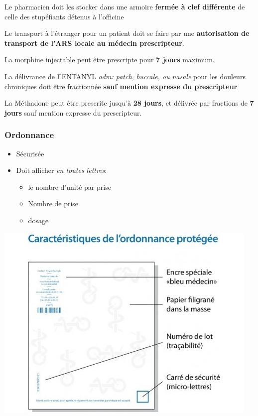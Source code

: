 \documentclass[11pt]{article}
\begin{document}
Le pharmacien doit les stocker dans une armoire \textbf{fermée à clef différente} de celle des stupéfiants détenus à l'officine

Le transport à l'étranger pour un patient doit se faire par une \textbf{autorisation de transport de l'ARS locale au médecin prescripteur}.

La morphine injectable peut être prescripte pour \textbf{7 jours} maximum.

La délivrance de FENTANYL \emph{adm: patch, buccale, ou nasale} pour les douleurs chroniques doit être fractionnée \textbf{sauf mention expresse du prescripteur}

La Méthadone peut être prescrite jusqu'à \textbf{28 jours}, et délivrée par fractions de \textbf{7 jours} sauf mention expresse du prescripteur.

\subsubsection{Ordonnance}
\label{sec:org422a202}
\begin{itemize}
\item Sécurisée
\item Doit afficher \emph{en toutes lettres}:
\begin{itemize}
\item le nombre d'unité par prise
\item Nombre de prise
\item dosage
\end{itemize}
\end{itemize}

\begin{center}
\includegraphics[width=.9\linewidth]{./ordo_securisee.png}
\end{center}
\end{document}
